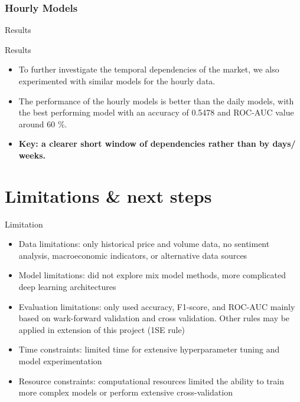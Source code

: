 \documentclass[aspectratio=43]{beamer} %
\begin{document}
\subsubsection{Hourly Models}
\begin{frame}{Results}
% 
\FloatBarrier
\end{frame}

\begin{frame}{Results}
\begin{itemize}
  \item To further investigate the temporal dependencies of the market, we also experimented with similar models for the hourly data. 
  \item The performance of the hourly models is better than the daily models, with the best performing model  with an accuracy of 0.5478 and ROC-AUC value around 60 \%. 
  \item \textbf{Key: a clearer short window of dependencies rather than by days/ weeks.}
\end{itemize}
\end{frame}



\section{Limitations \& next steps}
\begin{frame}{Limitation}
  \begin{itemize}
    \item Data limitations: only historical price and volume data, no sentiment analysis, macroeconomic indicators, or alternative data sources
    \item Model limitations: did not explore mix model methods, more complicated deep learning architectures
    \item Evaluation limitations: only used accuracy, F1-score, and ROC-AUC mainly based on wark-forward validation and cross validation. Other rules may be applied in extension of this project (1SE rule)
    \item Time constraints: limited time for extensive hyperparameter tuning and model experimentation
    \item Resource constraints: computational resources limited the ability to train more complex models or perform extensive cross-validation
    \end{itemize}
\end{frame}
\end{document}
